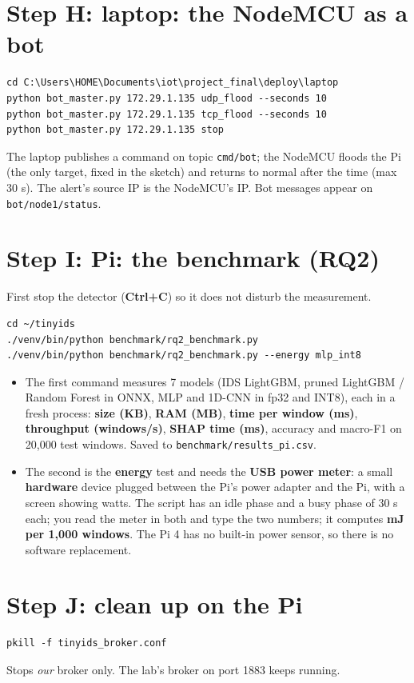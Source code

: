 \documentclass[11pt]{article}
\begin{document}
\section{Step H: laptop: the NodeMCU as a bot}
\begin{Verbatim}[frame=single]
cd C:\Users\HOME\Documents\iot\project_final\deploy\laptop
python bot_master.py 172.29.1.135 udp_flood --seconds 10
python bot_master.py 172.29.1.135 tcp_flood --seconds 10
python bot_master.py 172.29.1.135 stop
\end{Verbatim}
The laptop publishes a command on topic \texttt{cmd/bot}; the NodeMCU floods the Pi (the only target, fixed in the sketch) and returns to normal
after the time (max 30 s). The alert's source IP is the NodeMCU's IP. Bot messages appear on \texttt{bot/node1/status}.

\section{Step I: Pi: the benchmark (RQ2)}
First stop the detector (\textbf{Ctrl+C}) so it does not disturb the measurement.
\begin{Verbatim}[frame=single]
cd ~/tinyids
./venv/bin/python benchmark/rq2_benchmark.py
./venv/bin/python benchmark/rq2_benchmark.py --energy mlp_int8
\end{Verbatim}
\begin{itemize}
\item The first command measures 7 models (IDS LightGBM, pruned LightGBM / Random Forest in ONNX, MLP and 1D-CNN in fp32 and INT8), each in a fresh
process: \textbf{size (KB)}, \textbf{RAM (MB)}, \textbf{time per window (ms)}, \textbf{throughput (windows/s)}, \textbf{SHAP time (ms)},
accuracy and macro-F1 on 20,000 test windows. Saved to \texttt{benchmark/results\_pi.csv}.
\item The second is the \textbf{energy} test and needs the \textbf{USB power meter}: a small \textbf{hardware} device plugged between the Pi's power
adapter and the Pi, with a screen showing watts. The script has an idle phase and a busy phase of 30 s each; you read the meter in both and type the
two numbers; it computes \textbf{mJ per 1,000 windows}. The Pi 4 has no built-in power sensor, so there is no software replacement.
\end{itemize}

\section{Step J: clean up on the Pi}
\begin{Verbatim}[frame=single]
pkill -f tinyids_broker.conf
\end{Verbatim}
Stops \emph{our} broker only. The lab's broker on port 1883 keeps running.
\end{document}
